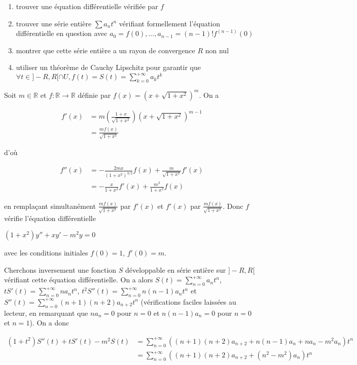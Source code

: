 \begin{enumerate}
\item trouver une équation différentielle vérifiée par $f$
\item trouver une série entière $\sum a_n t^n$ vérifiant formellement l'équation différentielle en question avec $a_0 = f(0), \ldots, a_{n-1} = (n-1)! f^{(n-1)}(0)$
\item montrer que cette série entière a un rayon de convergence $R$ non nul
\item utiliser un théorème de Cauchy Lipschitz pour garantir que $\forall t \in ]-R,R[ \cap U, f(t) = S(t) = \sum_{k=0}^{+\infty} a_k t^k$
\end{enumerate}

\begin{ex}
Soit $m \in \mathbb{R}$ et $f : \mathbb{R} \rightarrow \mathbb{R}$ définie par $f(x) = (x + \sqrt{1+x^2})^m$. On a

\begin{align*}
f'(x) &= m\left(\frac{1+x}{\sqrt{1+x^2}}\right)(x + \sqrt{1+x^2})^{m-1} \\
&= \frac{m f(x)}{\sqrt{1+x^2}}
\end{align*}

d'où

\begin{align*}
f''(x) &= -\frac{2mx}{(1+x^2)^{3/2}} f(x) + \frac{m}{\sqrt{1+x^2}} f'(x) \\
&= -\frac{x}{1+x^2} f'(x) + \frac{m^2}{1+x^2} f(x)
\end{align*}

en remplaçant simultanément $\frac{m f(x)}{\sqrt{1+x^2}}$ par $f'(x)$ et $f'(x)$ par $\frac{m f(x)}{\sqrt{1+x^2}}$. Donc $f$ vérifie l'équation différentielle

$(1+x^2) y'' + xy' - m^2 y = 0$

avec les conditions initiales $f(0) = 1$, $f'(0) = m$.

Cherchons inversement une fonction $S$ développable en série entière sur $]-R,R[$ vérifiant cette équation différentielle. On a alors $S(t) = \sum_{n=0}^{+\infty} a_n t^n$, $tS'(t) = \sum_{n=0}^{+\infty} n a_n t^n$, $t^2 S''(t) = \sum_{n=0}^{+\infty} n(n-1) a_n t^n$ et $S''(t) = \sum_{n=0}^{+\infty} (n+1)(n+2) a_{n+2} t^n$ (vérifications faciles laissées au lecteur, en remarquant que $n a_n = 0$ pour $n = 0$ et $n(n-1) a_n = 0$ pour $n = 0$ et $n = 1$). On a donc

\begin{align*}
(1+t^2) S''(t) + tS'(t) - m^2 S(t) &= \sum_{n=0}^{+\infty} \left((n+1)(n+2) a_{n+2} + n(n-1) a_n + n a_n - m^2 a_n \right) t^n \\
&= \sum_{n=0}^{+\infty} \left((n+1)(n+2) a_{n+2} + (n^2-m^2) a_n \right) t^n
\end{align*}


\end{ex}
